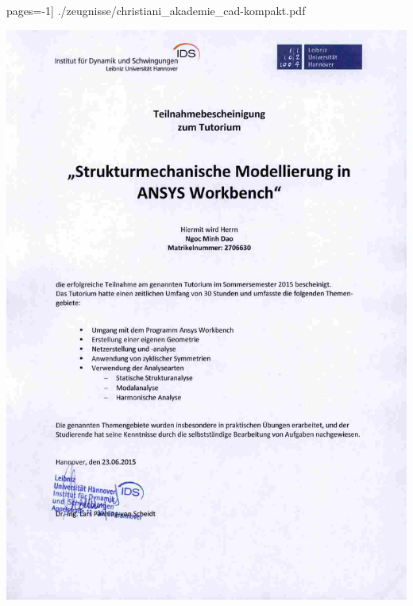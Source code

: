 \documentclass[12pt,a4paper]{scrartcl}
\begin{document}
 pages=-1] {./zeugnisse/christiani_akademie_cad-kompakt.pdf}


\includegraphics [width=\linewidth, height=\textheight] {./zeugnisse/ids_ansys_workbench_lq.jpg}

\end{document}
